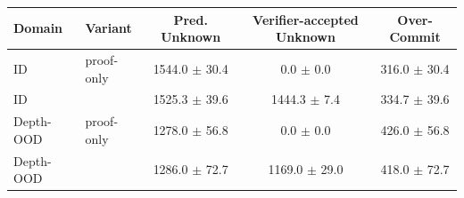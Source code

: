 \begin{tabular}{llccc}
\toprule
Domain & Variant & Pred. Unknown & Verifier-accepted Unknown & Over-Commit \\
\midrule
ID & proof-only & 1544.0 $\pm$ 30.4 & 0.0 $\pm$ 0.0 & 316.0 $\pm$ 30.4 \\
ID & \model{} & 1525.3 $\pm$ 39.6 & 1444.3 $\pm$ 7.4 & 334.7 $\pm$ 39.6 \\
\midrule
Depth-OOD & proof-only & 1278.0 $\pm$ 56.8 & 0.0 $\pm$ 0.0 & 426.0 $\pm$ 56.8 \\
Depth-OOD & \model{} & 1286.0 $\pm$ 72.7 & 1169.0 $\pm$ 29.0 & 418.0 $\pm$ 72.7 \\
\bottomrule
\end{tabular}